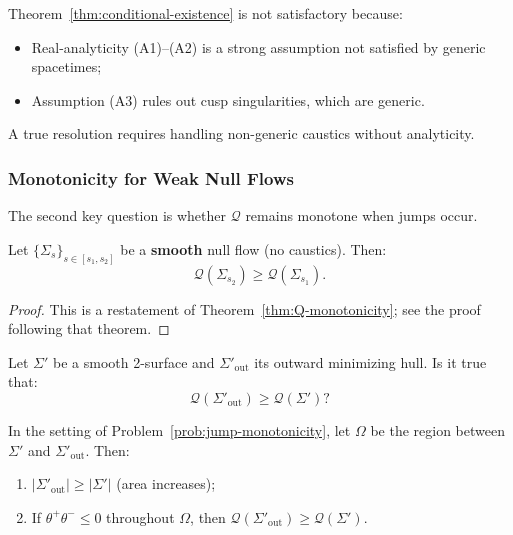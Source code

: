 \begin{remark}
Theorem~\ref{thm:conditional-existence} is not satisfactory because:
\begin{itemize}
\item Real-analyticity (A1)--(A2) is a strong assumption not satisfied by generic spacetimes;
\item Assumption (A3) rules out cusp singularities, which are generic.
\end{itemize}
A true resolution requires handling non-generic caustics without analyticity.
\end{remark}

\subsubsection{Monotonicity for Weak Null Flows}

The second key question is whether $\mathcal{Q}$ remains monotone when jumps occur.

\begin{theorem}
\label{thm:smooth-Q-monotonicity}
Let $\{\Sigma_s\}_{s \in [s_1, s_2]}$ be a \textbf{smooth} null flow (no caustics). Then:
\begin{equation}
\mathcal{Q}(\Sigma_{s_2}) \geq \mathcal{Q}(\Sigma_{s_1}).
\end{equation}
\end{theorem}

\begin{proof}
This is a restatement of Theorem~\ref{thm:Q-monotonicity}; see the proof following that theorem.
\end{proof}

\begin{openproblem}
\label{prob:jump-monotonicity}
\label{conj:weak-Q-monotonicity}
Let $\Sigma'$ be a smooth 2-surface and $\Sigma'_{\mathrm{out}}$ its outward minimizing hull. Is it true that:
\begin{equation}
\mathcal{Q}(\Sigma'_{\mathrm{out}}) \geq \mathcal{Q}(\Sigma')?
\end{equation}
\end{openproblem}

\begin{proposition}
\label{prop:partial-jump}
In the setting of Problem~\ref{prob:jump-monotonicity}, let $\Omega$ be the region between $\Sigma'$ and $\Sigma'_{\mathrm{out}}$. Then:
\begin{enumerate}[label=(\roman*)]
\item $|\Sigma'_{\mathrm{out}}| \geq |\Sigma'|$ (area increases);
\item If $\theta^+\theta^- \leq 0$ throughout $\Omega$, then $\mathcal{Q}(\Sigma'_{\mathrm{out}}) \geq \mathcal{Q}(\Sigma')$.
\end{enumerate}
\end{proposition}

